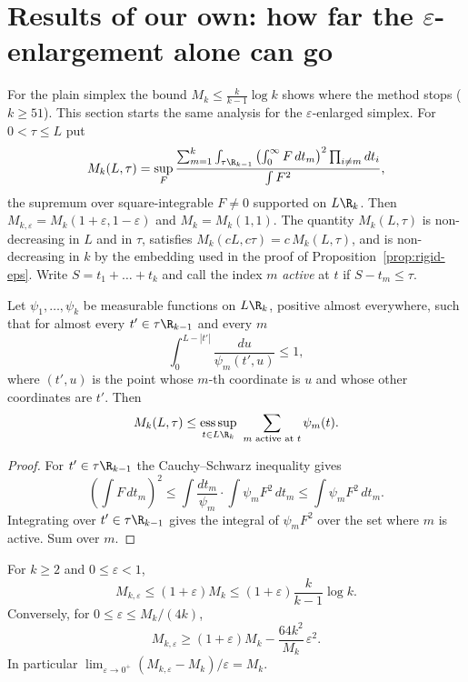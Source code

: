 \section{Results of our own: how far the \texorpdfstring{$\varepsilon$}{epsilon}-enlargement alone can go}\label{sec:epsfloor}

For the plain simplex the bound $M_k\le\frac{k}{k-1}\log k$ shows where the
method stops ($k\ge51$). This section starts the same analysis for the
$\varepsilon$-enlarged simplex. For $0<\tau\le L$ put
\[
M_k(L,\tau)=\sup_F\frac{\sum_{m=1}^k\int_{\tau\R_{k-1}}\left(\int_0^\infty F\,dt_m\right)^2\prod_{i\ne m}dt_i}{\int F^2},
\]
the supremum over square-integrable $F\ne0$ supported on $L\R_k$. Then
$M_{k,\varepsilon}=M_k(1+\varepsilon,1-\varepsilon)$ and $M_k=M_k(1,1)$. The
quantity $M_k(L,\tau)$ is non-decreasing in $L$ and in $\tau$, satisfies
$M_k(cL,c\tau)=c\,M_k(L,\tau)$, and is non-decreasing in $k$ by the embedding
used in the proof of Proposition~\ref{prop:rigid-eps}. Write
$S=t_1+\dots+t_k$ and call the index $m$ \emph{active} at $t$ if
$S-t_m\le\tau$.

\begin{lemma}\label{lem:dual}
Let $\psi_1,\dots,\psi_k$ be measurable functions on $L\R_k$, positive almost
everywhere, such that for almost every $t'\in\tau\R_{k-1}$ and every $m$
\[
\int_0^{L-|t'|}\frac{du}{\psi_m(t',u)}\le1,
\]
where $(t',u)$ is the point whose $m$-th coordinate is $u$ and whose other
coordinates are $t'$. Then
\[
M_k(L,\tau)\le\operatorname*{ess\,sup}_{t\in L\R_k}\ \sum_{m\text{ active at }t}\psi_m(t).
\]
\end{lemma}

\begin{proof}
For $t'\in\tau\R_{k-1}$ the Cauchy--Schwarz inequality gives
\[
\left(\int F\,dt_m\right)^2\le\int\frac{dt_m}{\psi_m}\cdot\int\psi_mF^2\,dt_m\le\int\psi_mF^2\,dt_m .
\]
Integrating over $t'\in\tau\R_{k-1}$ gives the integral of $\psi_mF^2$ over
the set where $m$ is active. Sum over $m$.
\end{proof}

\begin{proposition}\label{prop:eps-first}
For $k\ge2$ and $0\le\varepsilon<1$,
\[
M_{k,\varepsilon}\le(1+\varepsilon)M_k\le(1+\varepsilon)\frac{k}{k-1}\log k .
\]
Conversely, for $0\le\varepsilon\le M_k/(4k)$,
\[
M_{k,\varepsilon}\ge(1+\varepsilon)M_k-\frac{64k^2}{M_k}\,\varepsilon^2 .
\]
In particular $\lim_{\varepsilon\to0^+}(M_{k,\varepsilon}-M_k)/\varepsilon=M_k$.
\end{proposition}

